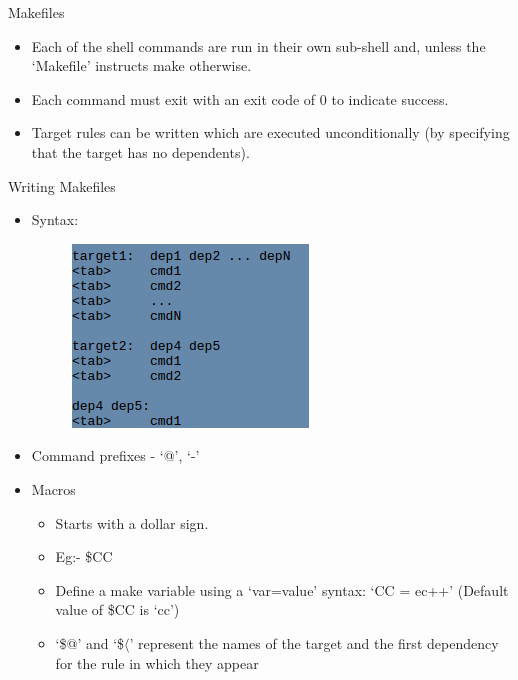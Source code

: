 \documentclass{beamer}
\begin{document}
\begin{frame}{Makefiles}
\begin{itemize}
	\item Each of the shell commands are run in their own sub-shell and, unless the `Makefile' instructs make otherwise.
	\item Each command must exit with an exit code of 0 to indicate success.
	\item Target rules can be written which are executed unconditionally (by specifying that the target has no dependents).
	
\end{itemize}
\end{frame}

\begin{frame}{Writing Makefiles}
\begin{itemize}
	\item Syntax:
	\begin{figure}
		\includegraphics[scale=0.4]{./Figures/MakefileSyntax.png}
	\end{figure}
	\item Command prefixes - `@', `-'
	\item Macros
	\begin{itemize}
		\item Starts with a dollar sign. 
		\item Eg:- \$CC
		\item Define a make variable using a `var=value' syntax: `CC = ec++' (Default value of \$CC is `cc')
		\item  `\$@' and `\$$\langle$' represent the names of the target and the first dependency for the rule in which they appear
	\end{itemize}
\end{itemize}
\end{frame}
\end{document}
